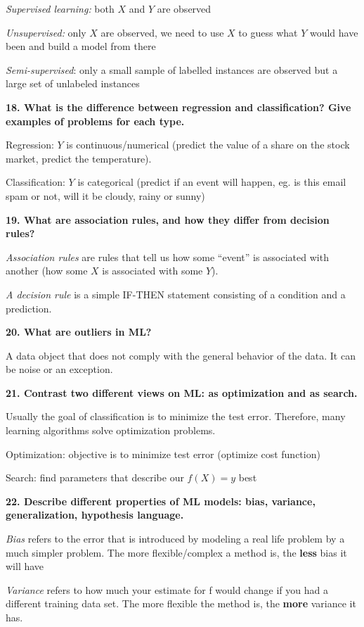 \textit{Supervised learning:} both $X$ and $Y$ are observed

\textit{Unsupervised:} only $X$ are observed, we need to use $X$ to guess
what $Y$ would have been and build a model from there

\textit{Semi-supervised}: only a small sample of labelled instances
are observed but a large set of unlabeled instances

\textbf{18. What is the difference between regression and
classification? Give examples of problems for each type.}

Regression: $Y$ is continuous/numerical (predict the value of a share on
the stock market, predict the temperature).

Classification: $Y$ is categorical (predict if an event will happen, eg.
is this email spam or not, will it be cloudy, rainy or sunny)

\textbf{19. What are association rules, and how they differ from
decision rules?}

\textit{Association rules} are rules that tell us how some ``event''
is associated with another (how some $X$ is associated with some $Y$).

\textit{A decision rule} is a simple IF-THEN statement consisting of
a condition and a prediction.

\textbf{20. What are outliers in ML?}

A data object that does not comply with the general behavior of the
data. It can be noise or an exception.

\textbf{21. Contrast two different views on ML: as optimization and as
search.}

Usually the goal of classification is to minimize the test error.
Therefore, many learning algorithms solve optimization problems.

Optimization: objective is to minimize test error (optimize cost
function)

Search: find parameters that describe our $f(X) = y$ best

\textbf{22. Describe different properties of ML models: bias, variance,
generalization, hypothesis language.}

\textit{Bias} refers to the error that is introduced by modeling a
real life problem by a much simpler problem. The more flexible/complex a
method is, the \textbf{less} bias it will have

\textit{Variance} refers to how much your estimate for f would change
if you had a different training data set. The more flexible the method
is, the \textbf{more} variance it has.

